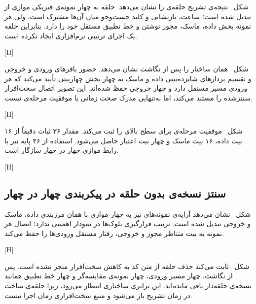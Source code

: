 شکل~ نتیجه‌ی تشریح حلقه‌ی  را نشان
می‌دهد. حلقه به چهار نمونه‌ی فیزیکی موازی از  تبدیل شده است؛ ساعت،
بازنشانی و کلید جست‌وجو میان آن‌ها مشترک است، ولی هر نمونه بخش داده، ماسک، مجوز نوشتن
و خط تطبیق مستقل خود را دارد. بنابراین حلقه یک اجرای ترتیبی نرم‌افزاری ایجاد نکرده است.

[H]

شکل~ همان ساختار را پس از نگاشت نشان می‌دهد. حضور
بافرهای ورودی و خروجی و تقسیم بردارهای شانزده‌بیتی داده و ماسک به چهار بخش چهار‌بیتی
تأیید می‌کند که هر ورودی مسیر مستقل دارد و چهار خروجی  حفظ شده‌اند.
این تصویر اتصال سخت‌افزار سنتزشده را مستند می‌کند، اما به‌تنهایی مدرک صحت زمانی یا موفقیت
مرحله‌ی  نیست.

[H]

شکل~ موفقیت مرحله‌ی  برای
سطح بالای  را ثبت می‌کند. مقدار ۳۶ ثبات دقیقاً از ۱۶ بیت داده، ۱۶ بیت ماسک
و چهار بیت اعتبار حاصل می‌شود. استفاده از ۴۶ پایه نیز با رابط موازی چهار در چهار سازگار است.

[H]

\subsection{سنتز نسخه‌ی بدون حلقه در پیکربندی چهار در چهار}

شکل~ نشان می‌دهد آرایه‌ی نمونه‌های
 نیز به چهار  موازی با همان مرزبندی داده، ماسک و
خروجی تبدیل شده است. ترتیب قرارگیری بلوک‌ها در نمودار اهمیتی ندارد؛ اتصال هر نمونه به
بیت متناظر مجوز و خروجی، رفتار مستقل ورودی‌ها را حفظ می‌کند.

[H]

شکل~ ثابت می‌کند حذف حلقه از متن کد به کاهش
سخت‌افزار منجر نشده است. پس از نگاشت، چهار مسیر ورودی، چهار نمونه‌ی مقایسه‌گر و چهار خط
تطبیق همانند نسخه‌ی حلقه‌دار باقی مانده‌اند. این برابری ساختاری انتظار می‌رود، زیرا حلقه‌ی
ساخت در زمان تشریح باز می‌شود و منبع سخت‌افزاری زمان اجرا نیست.

